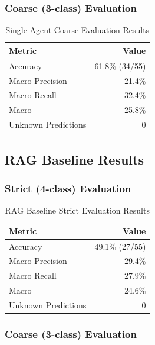 \subsubsection{Coarse (3-class) Evaluation}

\begin{table}[H]
\centering
\caption{Single-Agent Coarse Evaluation Results}
\label{tab:sa-coarse}
\begin{tabular}{lr}
\toprule
\textbf{Metric} & \textbf{Value} \\
\midrule
Accuracy            & 61.8\% (34/55) \\
Macro Precision     & 21.4\% \\
Macro Recall        & 32.4\% \\
Macro \fone{}       & 25.8\% \\
Unknown Predictions & 0 \\
\bottomrule
\end{tabular}
\end{table}

\subsection{RAG Baseline Results}

\subsubsection{Strict (4-class) Evaluation}

\begin{table}[H]
\centering
\caption{RAG Baseline Strict Evaluation Results}
\label{tab:rag-strict}
\begin{tabular}{lr}
\toprule
\textbf{Metric} & \textbf{Value} \\
\midrule
Accuracy            & 49.1\% (27/55) \\
Macro Precision     & 29.4\% \\
Macro Recall        & 27.9\% \\
Macro \fone{}       & 24.6\% \\
Unknown Predictions & 0 \\
\bottomrule
\end{tabular}
\end{table}

\subsubsection{Coarse (3-class) Evaluation}

